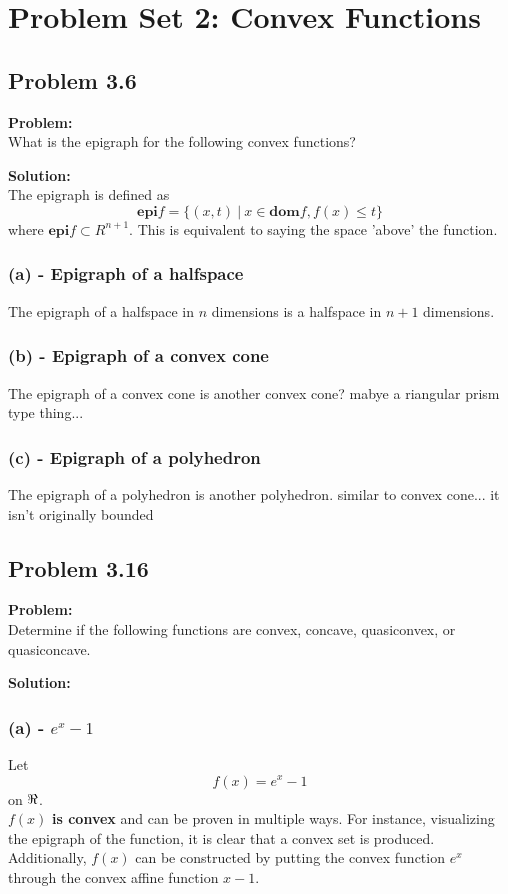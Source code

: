 \documentclass[letter]{article}
\begin{document}
\section{Problem Set 2: Convex Functions}

\subsection{Problem 3.6}
\textbf{Problem:}\\
What is the epigraph for the following convex functions?

\noindent
\textbf{Solution:}\\
The epigraph is defined as 
\begin{equation}
	\textbf{epi} f = \{(x,t) \ | \ x \in \textbf{dom} f, f(x) \leq t\}
\end{equation}
where $\textbf{epi} f \subset R^{n+1}$. This is equivalent to saying the space 'above' the function.

\subsubsection{(a) - Epigraph of a halfspace}
The epigraph of a halfspace in $n$ dimensions is a halfspace in $n+1$ dimensions.

\subsubsection{(b) - Epigraph of a convex cone}
The epigraph of a convex cone is another convex cone? mabye a riangular prism type thing...

\subsubsection{(c) - Epigraph of a polyhedron}
The epigraph of a polyhedron is another polyhedron. similar to convex cone... it isn't originally bounded

\subsection{Problem 3.16}
\textbf{Problem:}\\
Determine if the following functions are convex, concave, quasiconvex, or quasiconcave.

\noindent
\textbf{Solution:}\\
\subsubsection{(a) - $e^x - 1$}
Let $$f(x) = e^x - 1$$ on $\real$.\\
$f(x)$ \textbf{is convex} and can be proven in multiple ways. For instance, visualizing the epigraph of the function, it is clear that a convex set is produced. Additionally, $f(x)$ can be constructed by putting the convex function $e^x$ through the convex affine function $x - 1$.
\end{document}
